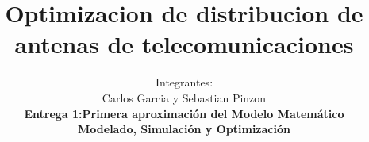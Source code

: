 \documentclass[runningheads]{llncs}
\begin{document}
%
\title{Optimizacion de distribucion de antenas de telecomunicaciones}
%
%
\author{Integrantes:\\ Carlos Garcia y Sebastian Pinzon \\
	\textbf{Entrega 1:Primera aproximaci\'{o}n del Modelo Matem\'{a}tico  \\Modelado, Simulaci\'{o}n y Optimizaci\'{o}n} \\}
%
%
%
\maketitle              %
%
%
%
%
\end{document}

